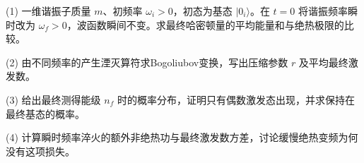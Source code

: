 (1) 一维谐振子质量 \(m\)、初频率 \(\omega_i>0\)，初态为基态 \(|0_i\rangle\)。在 \(t=0\) 将谐振频率瞬时改为 \(\omega_f>0\)，波函数瞬间不变。求最终哈密顿量的平均能量和与绝热极限的比较。

(2) 由不同频率的产生湮灭算符求Bogoliubov变换，写出压缩参数 \(r\) 及平均最终激发数。

(3) 给出最终测得能级 \(n_f\) 时的概率分布，证明只有偶数激发态出现，并求保持在最终基态的概率。

(4) 计算瞬时频率淬火的额外非绝热功与最终激发数方差，讨论缓慢绝热变频为何没有这项损失。
